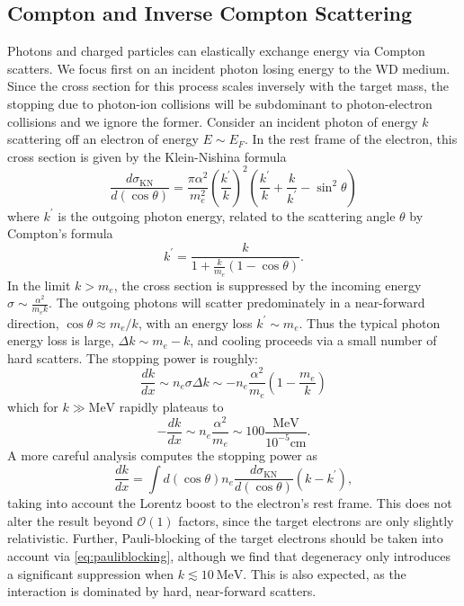 \documentclass[twocolumn,showpacs,preprintnumbers,amsmath,amssymb,prd]{revtex4}
\newcommand{\OO}{\mathcal{O}}
\newcommand{\MeV}{\text{MeV}}
\newcommand{\cm}{\text{cm}}
\def\r{\right)}
\def\l{\left(}
\begin{document}
\begin{appendices}
\subsection*{Compton and Inverse Compton Scattering}
Photons and charged particles can elastically exchange energy via Compton scatters.
We focus first on an incident photon losing energy to the WD medium.
Since the cross section for this process scales inversely with the target mass, the stopping due to photon-ion collisions will be subdominant to photon-electron collisions and we ignore the former. 
Consider an incident photon of energy $k$ scattering off an electron of energy $E \sim E_F$.
In the rest frame of the electron, this cross section is given by the Klein-Nishina formula
\begin{equation}
\label{KN}
  \frac{d\sigma_\text{KN}}{d (\cos \theta)} = \frac{\pi \alpha^2}{m_e^2} 
  \l \frac{k^\prime}{k} \r^2 
  \l \frac{k^\prime}{k} + \frac{k}{k^\prime} -\sin^2 \theta \r
\end{equation}
where $k^\prime$ is the outgoing photon energy, related to the scattering angle $\theta$ by Compton's formula
\begin{equation}
{k^{\prime }={\frac {k}{1+{\frac {k}{m_e}}(1-\cos \theta )}}}.
\end{equation}
In the limit $k > m_e$, the cross section is suppressed by the incoming energy $\sigma \sim \frac{\alpha^2}{m_e k}$. 
The outgoing photons will scatter predominately in a near-forward direction, $\cos \theta \approx m_e/k$, with an energy loss $k^\prime \sim m_e$.
Thus the typical photon energy loss is large, $\Delta k \sim m_e - k$, and cooling proceeds via a small number of hard scatters.
The stopping power is roughly:
\begin{equation}
\label{eq:approx-comptonSP}
  \frac{dk}{dx} \sim n_e \sigma \Delta{k} 
  \sim -n_e \frac{\alpha^2}{m_e} \l 1 - \frac{m_e}{k} \r
\end{equation}
which for $k \gg \MeV$ rapidly plateaus to
\begin{equation}
\label{eq:plateau-comptonSP}
  -\frac{dk}{dx} \sim n_e \frac{\alpha^2}{m_e} 
   \sim 100 \frac{\MeV}{10^{-5} \cm}.
\end{equation}
A more careful analysis computes the stopping power as 
\begin{equation}
\label{eq:comptonSP}
  \frac{dk}{dx} =  \int d (\cos \theta) n_e \frac{d\sigma_\text{KN}}{d (\cos \theta)} \l k - k^\prime \r, 
\end{equation}
taking into account the Lorentz boost to the electron's rest frame.
This does not alter the result beyond $\OO(1)$ factors, since the target electrons are only slightly relativistic.
Further, Pauli-blocking of the target electrons should be taken into account via \eqref{eq:pauliblocking}, although we find that degeneracy only introduces a significant suppression when $k \lesssim 10 ~\text{MeV}$.
This is also expected, as the interaction is dominated by hard, near-forward scatters.


\end{appendices}
\end{document}
